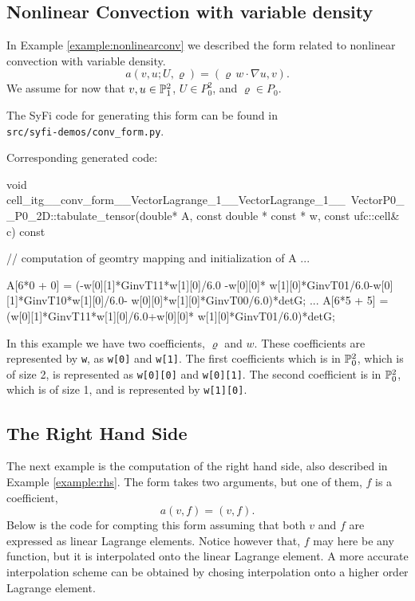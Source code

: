 \subsection{Nonlinear Convection with variable density} 
In Example \ref{example:nonlinearconv} we described the
form related to nonlinear convection with variable density. 
\begin{equation}
a(v,u; U,\varrho) = ( \varrho \, w \cdot \nabla  u, v). 
\end{equation}
We assume for now that 
$v, u \in \P_1^2$, $U\in P_0^2$, and  $\varrho \in P_0$.

The SyFi code for generating this form can be found in \\
\texttt{src/syfi-demos/conv\_form.py}.

Corresponding generated code: 
\begin{code}
void cell_itg__conv_form__VectorLagrange_1__VectorLagrange_1__\
     VectorP0__P0_2D::tabulate_tensor(double* A, 
     const double * const * w, const ufc::cell& c) const
{
  // computation of geomtry mapping and initialization of A ...
  
  A[6*0 + 0] = (-w[0][1]*GinvT11*w[1][0]/6.0 -w[0][0]*
      w[1][0]*GinvT01/6.0-w[0][1]*GinvT10*w[1][0]/6.0-
      w[0][0]*w[1][0]*GinvT00/6.0)*detG;
   ...
  A[6*5 + 5] = (w[0][1]*GinvT11*w[1][0]/6.0+w[0][0]*
      w[1][0]*GinvT01/6.0)*detG;
}
\end{code}

In this example we have two coefficients, $\varrho$ and $w$. These 
coefficients are represented by \texttt{w}, as \texttt{w[0]} and \texttt{w[1]}. The first coefficients
which is in $\P_0^2$, which is of size 2, is represented as 
\texttt{w[0][0]} and \texttt{w[0][1]}. The second coefficient 
is in $\P_0^2$, which is of size 1, and is represented by \texttt{w[1][0]}.  

\subsection{The Right Hand Side}
The next example is the computation of the right hand side, also described in 
Example \ref{example:rhs}. The form takes two arguments, 
but one of them, $f$ is a coefficient,  
\begin{equation}
a(v,f) = (v,f). 
\end{equation}
Below is the code for compting this form assuming that both 
$v$ and $f$ are expressed as linear Lagrange elements. 
Notice  however that, $f$ may here be any function, 
but it is interpolated onto the linear Lagrange element. 
A more accurate interpolation scheme can be obtained 
by chosing interpolation onto a higher order Lagrange element. 


